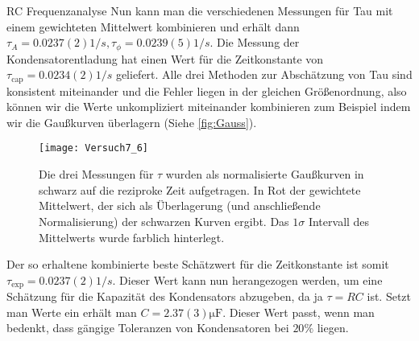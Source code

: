 \documentclass{alex_gp}
\begin{document}
\begin{mybox}{RC Frequenzanalyse}
	Nun kann man die verschiedenen Messungen für Tau mit einem gewichteten Mittelwert kombinieren und erhält dann \( \tau_{A} = 0.0237(2) \unit{1/s}, \tau_{\phi} = 0.0239(5) \unit{1/s} \). Die Messung der Kondensatorentladung hat einen Wert für die Zeitkonstante von \( \tau_{\text{cap}} = 0.0234(2) \unit{1/s} \) geliefert. Alle drei Methoden zur Abschätzung von Tau sind konsistent miteinander und die Fehler liegen in der gleichen Größenordnung, also können wir die Werte unkompliziert miteinander kombinieren zum Beispiel indem wir die Gaußkurven überlagern (Siehe \autoref{fig:Gauss}).
	
	\begin{figure}[H]	
		\centering
		\texttt{[image: Versuch7\_6]}
		\caption{Die drei Messungen für \( \tau \) wurden als normalisierte Gaußkurven in schwarz auf die reziproke Zeit aufgetragen. In Rot der gewichtete Mittelwert, der sich als Überlagerung (und anschließende Normalisierung) der schwarzen Kurven ergibt. Das \( 1\sigma \) Intervall des Mittelwerts wurde farblich hinterlegt.}
		\label{fig:Gauss}
	\end{figure}
	 Der so erhaltene kombinierte beste Schätzwert für die Zeitkonstante ist somit \( \tau_{\text{exp}} = 0.0237(2) \unit{1/s} \). Dieser Wert kann nun herangezogen werden, um eine Schätzung für die Kapazität des Kondensators abzugeben, da ja \( \tau = RC \) ist. Setzt man Werte ein erhält man \( C = 2.37(3) \unit{\micro\farad} \). Dieser Wert passt, wenn man bedenkt, dass gängige Toleranzen von Kondensatoren bei \( 20 \% \) liegen. 
\end{mybox}
\end{document}

